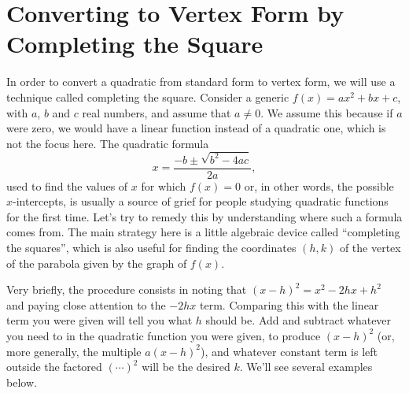 \documentclass{ximera}
\begin{document}
\section{Converting to Vertex Form by Completing the Square}
In order to convert a quadratic from standard form to vertex form, we will use a technique called completing the square. Consider a generic $f(x) = ax^2+bx+c$, with $a$, $b$ and $c$ real numbers, and assume that $a \neq 0$. We assume this because if $a$ were zero, we would have a linear function instead of a quadratic one, which is not the focus here. The quadratic formula $$  x = \frac{-b \pm \sqrt{b^2-4ac}}{2a},$$used to find the values of $x$ for which $f(x) = 0$ or, in other words, the possible $x$-intercepts, is usually a source of grief for people studying quadratic functions for the first time. Let's try to remedy this by understanding where such a formula comes from. The main strategy here is a little algebraic device called ``completing the squares'', which is also useful for finding the coordinates $(h,k)$ of the vertex of the parabola given by the graph of $f(x)$.

Very briefly, the procedure consists in noting that $(x-h)^2 = x^2-2hx+h^2$ and paying close attention to the $-2hx$ term. Comparing this with the linear term you were given will tell you what $h$ should be. Add and subtract whatever you need to in the quadratic function you were given, to produce $(x-h)^2$ (or, more generally, the multiple $a(x-h)^2$), and whatever constant term is left outside the factored $(\cdots)^2$ will be the desired $k$. We'll see several examples below.
\end{document}
